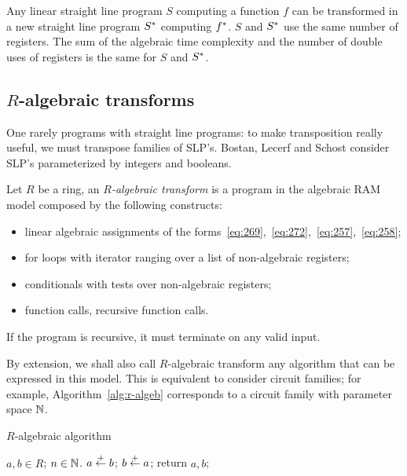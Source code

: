 \begin{theorem}
  \label{th:tellegen-slp}
  Any linear straight line program $S$ computing a function $f$ can be
  transformed in a new straight line program $S^\ast$ computing
  $f^\ast$.  $S$ and $S^\ast$ use the same number of
  registers. The sum of the algebraic time complexity and the number
  of double uses of registers is the same for $S$ and $S^\ast$.
\end{theorem}



\subsection{$R$-algebraic transforms}
\label{sec:r-algebraic-transforms}
One rarely programs with straight line programs: to make transposition
really useful, we must transpose families of SLP's. Bostan, Lecerf and
Schost consider SLP's parameterized by integers and booleans.

\begin{definition}
  Let $R$ be a ring, an \emph{$R$-algebraic
    transform} is a program in the algebraic RAM model composed by the
  following constructs:
  \begin{itemize}
  \item linear algebraic assignments of the
    forms~\eqref{eq:269},~\eqref{eq:272},~\eqref{eq:257},~\eqref{eq:258};
  \item for loops with iterator ranging over a list of non-algebraic
    registers;
  \item conditionals with tests over non-algebraic registers;
  \item function calls, recursive function calls.
  \end{itemize}
  If the program is recursive, it must terminate on any valid input.
\end{definition}

By extension, we shall also call $R$-algebraic transform any algorithm
that can be expressed in this model. This is equivalent to consider
circuit families; for example, Algorithm~\ref{alg:r-algeb} corresponds
to a circuit family with parameter space $\mathbb{N}$.


\begin{algorithm}
  \caption{\label{alg:r-algeb}$R$-algebraic algorithm}
  \begin{algorithmic}
    \REQUIRE $a,b\in R$; $n\in\mathbb{N}$.
    \STATE $a \overset{+}{\leftarrow} b$;
    \ELSE
    \STATE $b \overset{+}{\leftarrow} a$;
    \ENDIF
    \ENDFOR
    \STATE return $a,b$;
  \end{algorithmic}
\end{algorithm}

